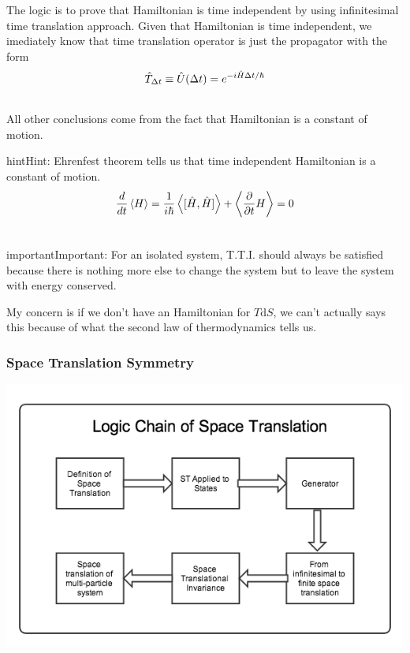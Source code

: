 \documentclass[letterpaper,10pt,english]{sphinxmanual}
\newcommand{\avg}[1]{\left< #1 \right>}
\begin{document}
The logic is to prove that Hamiltonian is time independent by using infinitesimal time translation approach. Given that Hamiltonian is time independent, we imediately know that time translation operator is just the propagator with the form
\begin{gather}
\begin{split}\hat T_{\Delta t} \equiv \hat U(\Delta t) = e^{-i \hat H \Delta t /\hbar}\end{split}\notag\\\begin{split}\end{split}\notag
\end{gather}
All other conclusions come from the fact that Hamiltonian is a constant of motion.

\begin{notice}{hint}{Hint:}
Ehrenfest theorem tells us that time independent Hamiltonian is a constant of motion.
\begin{gather}
\begin{split}\frac{d}{dt}\avg{H} = \frac{1}{i\hbar}\avg{[\hat H, \hat H]} + \avg{\frac{\partial}{\partial t} H } = 0\end{split}\notag\\\begin{split}\end{split}\notag
\end{gather}\end{notice}

\begin{notice}{important}{Important:}
For an isolated system, T.T.I. should always be satisfied because there is nothing more else to change the system but to leave the system with energy conserved.

My concern is if we don't have an Hamiltonian for $T\mathrm d S$, we can't actually says this because of what the second law of thermodynamics tells us.
\end{notice}


\subsubsection{Space Translation Symmetry}
\label{symmetries:space-translation-symmetry}
\includegraphics{SpaceTranslation.png}
\end{document}
